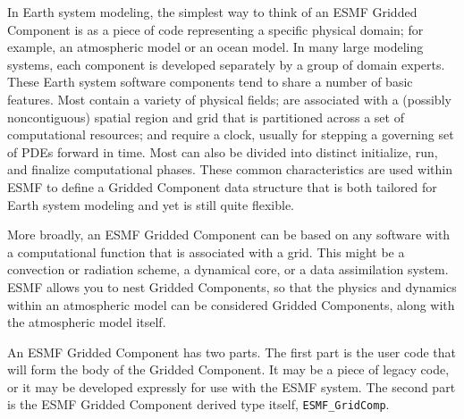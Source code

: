 %


In Earth system modeling, the simplest way to think of an 
ESMF Gridded Component is as a piece of code representing a 
specific physical domain; for example, an atmospheric model 
or an ocean model.  In many large modeling systems, each 
component is developed separately by a group of domain experts.  
These Earth system software components tend to share a number of 
basic features.  Most contain a variety of physical fields; 
are associated with a (possibly noncontiguous) 
spatial region and grid that is partitioned across a set of 
computational resources; and require a clock, usually for stepping 
a governing set of PDEs forward in time.  Most can also 
be divided into distinct initialize, run, and finalize 
computational phases.  These common characteristics are used 
within ESMF to define a Gridded Component data structure that 
is both tailored for Earth system modeling and yet is still 
quite flexible.

More broadly, an ESMF Gridded Component can be based on any 
software with a computational function that is associated with 
a grid.  This might be a convection or radiation scheme, a 
dynamical core, or a data assimilation system.  ESMF allows you
to nest Gridded Components, so that the physics and dynamics within 
an atmospheric model can be considered Gridded Components, along
with the atmospheric model itself.

An ESMF Gridded Component has two parts.  The first part is the
user code that will form the body of the Gridded Component.
It may be a piece of legacy code, or it may be developed expressly
for use with the ESMF system.  The second part is the ESMF Gridded 
Component derived type itself, {\tt ESMF_GridComp}.









